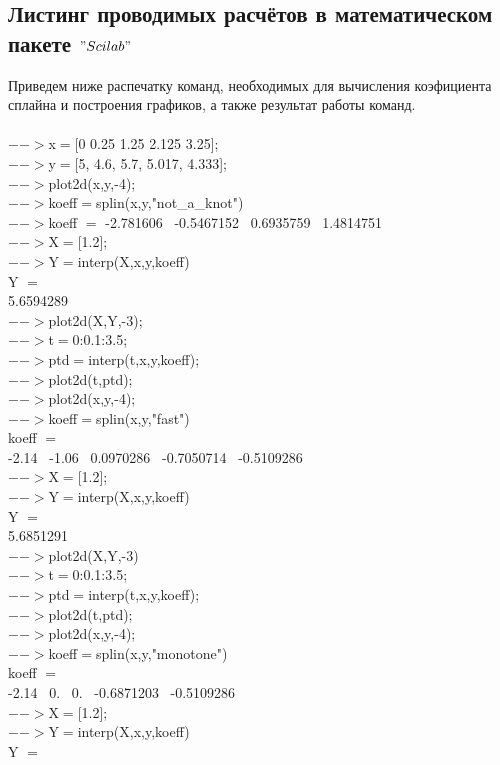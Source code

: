 \documentclass[russian,utf8,nocolumnxxxi,nocolumnxxxii]{eskdtext}
\begin{document}
\newpage
\subsection{Листинг проводимых расчётов в математическом пакете $"Scilab"$}
Приведем ниже распечатку команд, необходимых для вычисления коэфициента сплайна и построения графиков, а также результат работы команд.\\
\\
$-->$x$=$[0 0.25 1.25 2.125 3.25];\\
$-->$y$=$[5, 4.6, 5.7, 5.017, 4.333];\\
$-->$plot2d(x,y,-4);\\
$-->$koeff$=$splin(x,y,"not\_a\_knot")\\
$-->$koeff $=$
-2.781606 \ -0.5467152 \ 0.6935759  \ 1.4814751 \\
$-->$X$=$[1.2];\\
$-->$Y$=$interp(X,x,y,koeff)\\
Y $=$\\
5.6594289 \\
$-->$plot2d(X,Y,-3); \\
$-->$t$=$0:0.1:3.5;\\
$-->$ptd$=$interp(t,x,y,koeff);\\
$-->$plot2d(t,ptd);\\
$-->$plot2d(x,y,-4);\\
$-->$koeff$=$splin(x,y,"fast")\\
koeff $=$\\
-2.14 \ -1.06 \ 0.0970286 \ -0.7050714 \ -0.5109286 \\
$-->$X$=$[1.2];\\
$-->$Y$=$interp(X,x,y,koeff)\\
Y $=$\\
5.6851291 \\
$-->$plot2d(X,Y,-3)\\
$-->$t$=$0:0.1:3.5;\\
$-->$ptd$=$interp(t,x,y,koeff);\\
$-->$plot2d(t,ptd);\\
$-->$plot2d(x,y,-4);\\
$-->$koeff$=$splin(x,y,"monotone")\\
koeff $=$\\
-2.14 \ 0. \ 0. \ -0.6871203 \ -0.5109286 \\
$-->$X$=$[1.2];\\
$-->$Y$=$interp(X,x,y,koeff)\\
Y $=$\\
\end{document}
